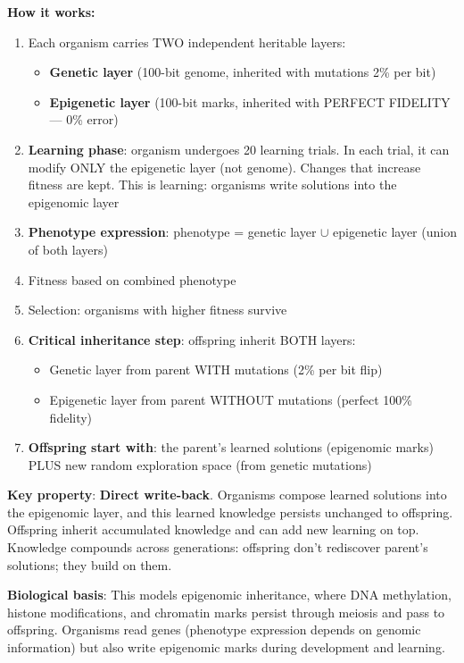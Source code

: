 \documentclass[12pt]{article}
\begin{document}
\textbf{How it works:}
\begin{enumerate}
\item Each organism carries TWO independent heritable layers:
  \begin{itemize}
  \item \textbf{Genetic layer} (100-bit genome, inherited with mutations 2\% per bit)
  \item \textbf{Epigenetic layer} (100-bit marks, inherited with PERFECT FIDELITY — 0\% error)
  \end{itemize}
\item \textbf{Learning phase}: organism undergoes 20 learning trials. In each trial, it can modify ONLY the epigenetic layer (not genome). Changes that increase fitness are kept. This is learning: organisms write solutions into the epigenomic layer
\item \textbf{Phenotype expression}: phenotype = genetic layer $\cup$ epigenetic layer (union of both layers)
\item Fitness based on combined phenotype
\item Selection: organisms with higher fitness survive
\item \textbf{Critical inheritance step}: offspring inherit BOTH layers:
  \begin{itemize}
  \item Genetic layer from parent WITH mutations (2\% per bit flip)
  \item Epigenetic layer from parent WITHOUT mutations (perfect 100\% fidelity)
  \end{itemize}
\item \textbf{Offspring start with}: the parent's learned solutions (epigenomic marks) PLUS new random exploration space (from genetic mutations)
\end{enumerate}

\textbf{Key property}: \textbf{Direct write-back}. Organisms compose learned solutions into the epigenomic layer, and this learned knowledge persists unchanged to offspring. Offspring inherit accumulated knowledge and can add new learning on top. Knowledge compounds across generations: offspring don't rediscover parent's solutions; they build on them.

\textbf{Biological basis}: This models epigenomic inheritance, where DNA methylation, histone modifications, and chromatin marks persist through meiosis and pass to offspring. Organisms read genes (phenotype expression depends on genomic information) but also write epigenomic marks during development and learning.
\end{document}
